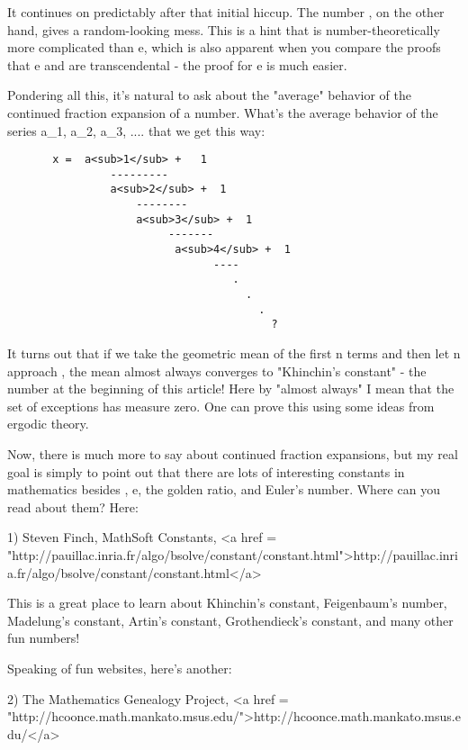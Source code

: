 It continues on predictably after that initial hiccup.  The number \pi ,
on the other hand, gives a random-looking mess.  This is a hint that
\pi  is number-theoretically more complicated than e, which is also
apparent when you compare the proofs that e and \pi  are transcendental
- the proof for e is much easier.

Pondering all this, it's natural to ask about the "average" behavior
of the continued fraction expansion of a number.   What's the average
behavior of the series a_{1}, 
a_{2}, a_{3}, .... that we get this way:

\begin{verbatim}
       x =  a<sub>1</sub> +   1
                ---------
                a<sub>2</sub> +  1
                    -------- 
                    a<sub>3</sub> +  1
                         -------
                          a<sub>4</sub> +  1
                                ----
                                   .
                                     .
                                       .
                                         ?
\end{verbatim}
    
It turns out that if we take the geometric mean of the first n terms
and then let n approach \infty , the mean almost always converges to
"Khinchin's constant" - the number at the beginning of this article!
Here by "almost always" I mean that the set of exceptions has measure
zero.  One can prove this using some ideas from ergodic theory.



Now, there is much more to say about continued fraction expansions,
but my real goal is simply to point out that there are lots of
interesting constants in mathematics besides \pi , e, the golden
ratio, and Euler's number.  Where can you read about them?  Here:

1) Steven Finch, MathSoft Constants,
<a href = "http://pauillac.inria.fr/algo/bsolve/constant/constant.html">http://pauillac.inria.fr/algo/bsolve/constant/constant.html</a>

This is a great place to learn about Khinchin's constant,
Feigenbaum's number, Madelung's constant, Artin's constant, 
Grothendieck's constant, and many other fun numbers!   

Speaking of fun websites, here's another:

2) The Mathematics Genealogy Project, <a href = "http://hcoonce.math.mankato.msus.edu/">http://hcoonce.math.mankato.msus.edu/</a>

